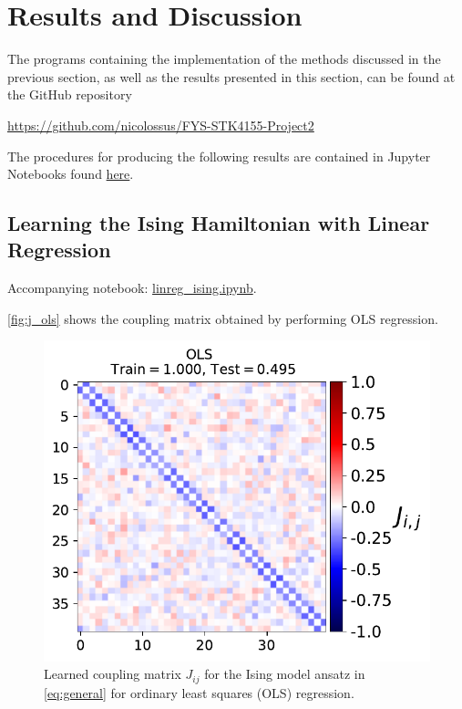 \section{Results and Discussion}\label{sec:Results}

The programs containing the implementation of the methods discussed in the previous section, as well as the results presented in this section, can be found at the GitHub repository
\begin{center}
    \url{https://github.com/nicolossus/FYS-STK4155-Project2}
\end{center}

The procedures for producing the following results are contained in Jupyter Notebooks found \href{https://github.com/nicolossus/FYS-STK4155-Project2/tree/master/notebooks}{here}.

\subsection{Learning the Ising Hamiltonian with Linear Regression}\label{sec:results linreg}
Accompanying notebook: \href{https://github.com/nicolossus/FYS-STK4155-Project2/blob/master/notebooks/linreg_ising.ipynb}{linreg\_ising.ipynb}.


\autoref{fig:j_ols} shows the coupling matrix obtained by performing OLS regression.

\begin{figure}[H]
\begin{center}\includegraphics[scale=0.6]{latex/figures/ising_J_ols.pdf}
\end{center}
\caption{Learned coupling matrix $J_{ij}$ for the Ising model ansatz in \autoref{eq:general} for ordinary least squares (OLS) regression.}
\label{fig:j_ols}
\end{figure}


